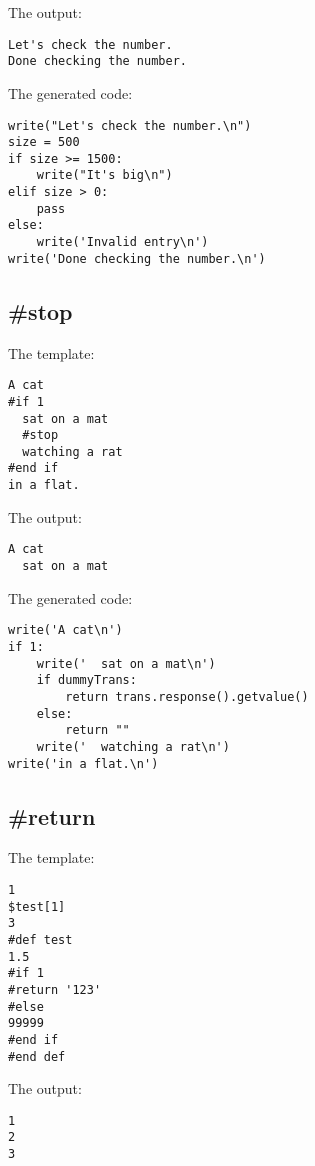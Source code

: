 The output:
\begin{verbatim}
Let's check the number.
Done checking the number.
\end{verbatim}

The generated code:
\begin{verbatim}
write("Let's check the number.\n")
size = 500
if size >= 1500:
    write("It's big\n")
elif size > 0:
    pass
else:
    write('Invalid entry\n')
write('Done checking the number.\n')
\end{verbatim}

\subsection{\#stop}
\label{flowControl.stop}

The template:
\begin{verbatim}
A cat
#if 1
  sat on a mat
  #stop
  watching a rat
#end if
in a flat.
\end{verbatim}

The output:
\begin{verbatim}
A cat
  sat on a mat
\end{verbatim}

The generated code:
\begin{verbatim}
write('A cat\n')
if 1:
    write('  sat on a mat\n')
    if dummyTrans:
        return trans.response().getvalue()
    else:
        return ""
    write('  watching a rat\n')
write('in a flat.\n')
\end{verbatim}

\subsection{\#return}
\label{flowControl.return}

The template:
\begin{verbatim}
1
$test[1]
3
#def test
1.5
#if 1
#return '123'
#else
99999
#end if
#end def
\end{verbatim}

The output:
\begin{verbatim}
1
2
3
\end{verbatim}

